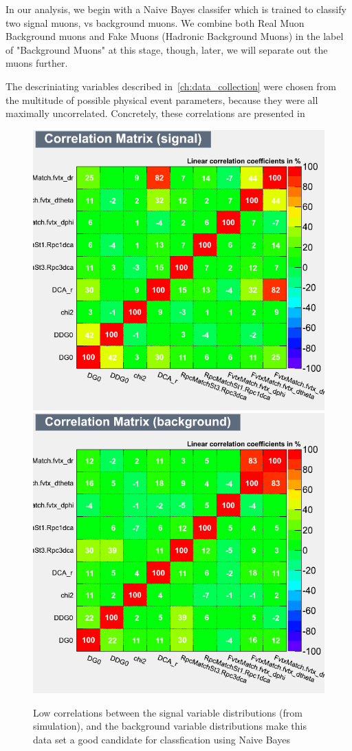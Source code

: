 In our analysis, we begin with a Naive Bayes classifer which is trained to
classify two signal muons, vs background muons. We combine both Real Muon
Background muons and Fake Muons (Hadronic Background Muons) in the label of
"Background Muons" at this stage, though, later, we will separate out the muons
further.

The descriniating variables described in~\ref{ch:data_collection} were
chosen from the multitude of possible physical event parameters, because they
were all maximally uncorrelated. Concretely, these correlations are presented in

\begin{figure}[H]
	\begin{center}
		{
			\includegraphics[width=0.65\linewidth]{../Chapter5/fig/CorrelationMatrix_Signal.png}
			\includegraphics[width=0.65\linewidth]{../Chapter5/fig/CorrelationMatrix_Background.png}
		}	
		\caption{ Low correlations between the signal variable distributions (from
		simulation), and the background variable distributions make this data set
		a good candidate for classfication using Naive Bayes}
		\label{fig:kinematic_var_correlations}
	\end{center}
\end{figure}

